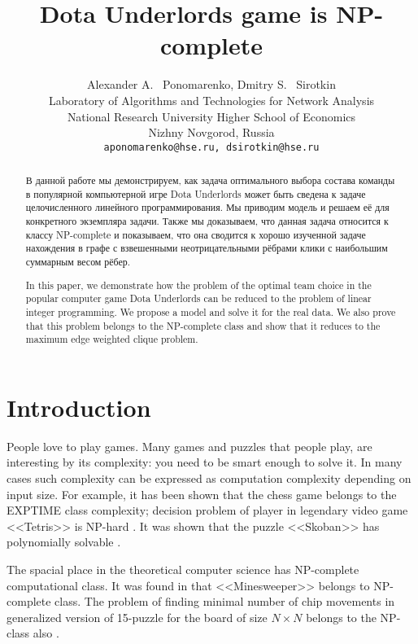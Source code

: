 \documentclass{article}
\title{Dota Underlords game is NP-complete}
\author{
  Alexander A. ~Ponomarenko, Dmitry S. ~Sirotkin \\
  Laboratory of Algorithms and Technologies for Network Analysis\\
  National Research University Higher School of Economics \\
  Nizhny Novgorod, Russia\\
  \texttt{aponomarenko@hse.ru, dsirotkin@hse.ru} \\
}
\begin{document}
\maketitle

\begin{abstract}
В данной работе мы демонстрируем, как задача оптимального выбора состава команды в популярной компьютерной игре Dota Underlords может быть сведена к задаче целочисленного линейного программирования. Мы приводим модель и решаем её для конкретного экземпляра задачи. Также мы доказываем, что данная задача относится к классу NP-complete и показываем, что она сводится к хорошо изученной задаче нахождения в графе с взвешенными неотрицательными рёбрами клики с наибольшим суммарным весом рёбер. 

In this paper, we demonstrate how the problem of the optimal team choice in the popular computer game Dota Underlords can be reduced to the problem of linear integer  programming. We propose a model and solve it for the real data. We also prove that this problem belongs to the NP-complete class and show that it reduces to the maximum edge weighted clique problem.

\end{abstract}




\section{Introduction}
People love to play games. Many games and puzzles that people play, are interesting by its complexity: you need to be smart  enough to solve it. In many cases such complexity can be expressed as computation complexity depending on input size. For example, it has been shown \cite{fraenkel1981computing} that the chess game belongs to the EXPTIME class complexity; 
decision problem of player in legendary video game <<Tetris>> is NP-hard \cite{breukelaar2004tetris}. It was shown that the puzzle  <<Skoban>>  has polynomially solvable \cite{hearn2005pspace}.

The spacial place in the theoretical computer science has NP-complete computational class.
It was found in \cite{kaye2000minesweeper} that <<Minesweeper>> belongs to NP-complete class. The problem of finding minimal number of chip movements in generalized version of 15-puzzle for the board of size $N \times N$ belongs to the NP-class also  \cite{ratner1986finding}.
\end{document}
